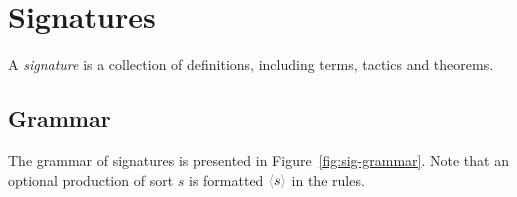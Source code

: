 \chapter{Signatures}


A \emph{signature} is a collection of definitions, including terms, tactics and theorems.

\section{Grammar}
\label{sec:sig-grammar}

The grammar of \RedPRL{} signatures is presented in
Figure~\ref{fig:sig-grammar}. Note that an optional production of sort $s$ is
formatted $\Optional{s}$ in the rules.

